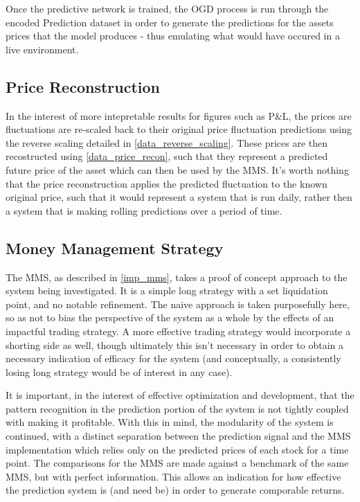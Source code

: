 \documentclass[a4paper,latin]{paper}
\begin{document}
Once the predictive network is trained, the OGD process is run through the encoded Prediction dataset in order to generate the predictions for the assets prices that the model produces - thus emulating what would have occured in a live environment. \newline

\subsection{Price Reconstruction}\label{proc_precerecon}

In the interest of more intepretable results for figures such as P\&L, the prices are fluctuations are re-scaled back to their original price fluctuation predictions using the reverse scaling detailed in \ref{data_reverse_scaling}. These prices are then recostructed using \ref{data_price_recon}, such that they represent a predicted future price of the asset which can then be used by the MMS. It's worth nothing that the price reconstruction applies the predicted fluctuation to the known original price, such that it would represent a system that is run daily, rather then a system that is making rolling predictions over a period of time.

\subsection{Money Management Strategy}\label{proc_mms}

The MMS, as described in \ref{imp_mms}, takes a proof of concept approach to the system being investigated. It is a simple long strategy with a set liquidation point, and no notable refinement. The naive approach is taken purposefully here, so as not to bias the perspective of the system as a whole by the effects of an impactful trading strategy. A more effective trading strategy would incorporate a shorting side as well, though ultimately this isn't necessary in order to obtain a necessary indication of efficacy for the system (and conceptually, a consistently losing long strategy would be of interest in any case).  \newline

It is important, in the interest of effective optimization and development, that the pattern recognition in the prediction portion of the system is not tightly coupled with making it profitable. With this in mind, the modularity of the system is continued, with a distinct separation between the prediction signal and the MMS implementation which relies only on the predicted prices of each stock for a time point. The comparisons for the MMS are made against a benchmark of the same MMS, but with perfect information. This allows an indication for how effective the prediction system is (and need be) in order to generate comporable returns. \newline {}
\end{document}
